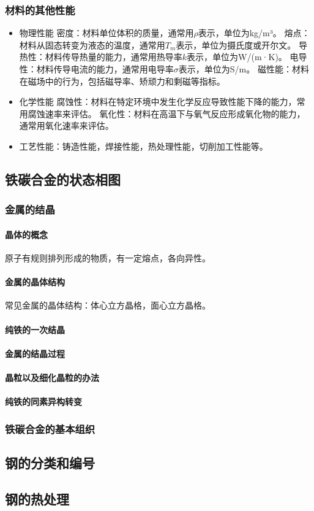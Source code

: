 \documentclass[12pt,a4paper]{article}
\begin{document}
\subsubsection{材料的其他性能}
\begin{itemize}
  \item 物理性能
   \subitem 密度：材料单位体积的质量，通常用$\rho$表示，单位为kg/m³。
   \subitem 熔点：材料从固态转变为液态的温度，通常用$T_m$表示，单位为摄氏度或开尔文。
   \subitem 导热性：材料传导热量的能力，通常用热导率$k$表示，单位为W/(m·K)。
   \subitem 电导性：材料传导电流的能力，通常用电导率$\sigma$表示，单位为S/m。
   \subitem 磁性能：材料在磁场中的行为，包括磁导率、矫顽力和剩磁等指标。
  \item 化学性能
   \subitem 腐蚀性：材料在特定环境中发生化学反应导致性能下降的能力，常用腐蚀速率来评估。
   \subitem 氧化性：材料在高温下与氧气反应形成氧化物的能力，通常用氧化速率来评估。
  \item 工艺性能：铸造性能，焊接性能，热处理性能，切削加工性能等。
\end{itemize}
\subsection{铁碳合金的状态相图}
\subsubsection{金属的结晶}
\paragraph{晶体的概念}原子有规则排列形成的物质，有一定熔点，各向异性。
\paragraph{金属的晶体结构}
常见金属的晶体结构：体心立方晶格，面心立方晶格。
\paragraph{纯铁的一次结晶}
\paragraph{金属的结晶过程}
\paragraph{晶粒以及细化晶粒的办法}
\paragraph{纯铁的同素异构转变}
\subsubsection{铁碳合金的基本组织}
\subsection{钢的分类和编号}
\subsection{钢的热处理}
\end{document}
